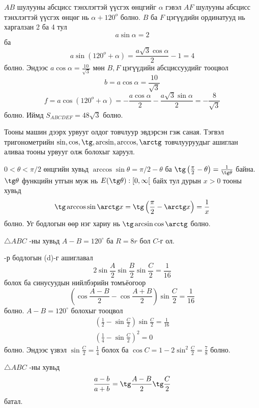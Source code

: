 \documentclass[10pt,a4paper,oneside]{book}
\begin{document}
\ASolution
$AB$ шулууны абсцисс тэнхлэгтэй үүсгэх өнцгийг $\alpha$ гэвэл $AF$ шулууны абсцисс тэнхлэгтэй үүсгэх өнцөг нь $\alpha + 120^o$ болно. $B$ ба $F$ цэгүүдийн ординатууд нь харгалзан 2 ба 4 тул $$a\sin \alpha = 2$$ ба $$a\sin(120^o + \alpha) = \frac{a\sqrt{3}\cos \alpha}{2}- 1 = 4$$
болно. Эндээс $a\cos \alpha = \frac{10}{\sqrt{3}}$ мөн $B, F$ цэгүүдийн абсциссуудийг тооцвол
$$b = a\cos \alpha = \frac{10}{\sqrt{3}}$$
$$f = a\cos (120^o + \alpha) = -\frac{a\cos \alpha}{2} - \frac{a\sqrt{3}\sin \alpha}{2} = -\frac{8}{\sqrt{3}}$$
болно. Иймд $S_{ABCDEF} = 48\sqrt{3}$ болно.


\Problem
Тооны машин дээрх урвууг олдог товчлуур эвдэрсэн гэж саная. Тэгвэл тригонометрийн $\sin, \cos, \tg, \arcsin, \arccos, \arctg$ товчлууруудыг ашиглан аливаа тооны урвууг олж болохыг харуул.

\TheSolution
$0<\theta < \pi/2$ өнцгийн хувьд $\arccos\sin \theta = \pi/2 - \theta$ ба $\tg\left(\frac{\pi}{2} - \theta\right) = \frac{1}{\tg\theta}$ байна. $\tg\theta$ функцийн утгын муж нь $E(\tg\theta): [0, \infty[$ байх тул дурын $x > 0$ тооны хувьд
\begin{equation*}
\tg\arccos\sin\arctg x = \tg \left(\frac{\pi}{2} - \arctg x \right) = \frac{1}{x}
\end{equation*}
болно. Уг бодлогын өөр нэг хариу нь $\tg\arcsin\cos\arctg$ болно.

\Problem
$\triangle ABC$ -ны хувьд $A-B=120^\circ$ ба $R=8r$ бол $C$-г ол.

-р бодлогын (d)-г ашиглавал
\begin{equation*}
2\sin\frac{A}{2}\sin\frac{B}{2}\sin\frac{C}{2} = \frac{1}{16}
\end{equation*}
болох ба синусуудын нийлбэрийн томъёогоор
\begin{equation*}
\left(\cos\frac{A-B}{2} - \cos\frac{A+B}{2}\right)\sin\frac{C}{2} = \frac{1}{16}
\end{equation*}
болно. $A-B=120^\circ$ болохыг тооцвол
\begin{align*}
\left(\frac{1}{2} - \sin\frac{C}{2}\right)\sin\frac{C}{2} = \frac{1}{16} \\
\left(\frac{1}{4} - \sin\frac{C}{2}\right)^2 = 0
\end{align*}
болно. Эндээс үзвэл $\sin\frac{C}{2} = \frac{1}{4}$ болох ба $\cos C = 1-2\sin^2 \frac{C}{2} = \frac{7}{8}$ болно.

\Problem
$\triangle ABC$ -ны хувьд
\begin{equation*}
\frac{a-b}{a+b} = \tg\frac{A-B}{2}\tg\frac{C}{2}
\end{equation*}
батал.
\end{document}
